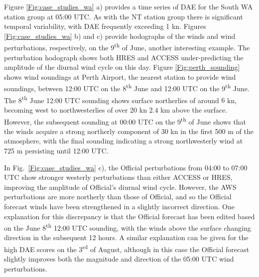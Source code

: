 \documentclass[twocol]{ametsoc}
\begin{document}
Figure \ref{Fig:case_studies_wa} a) provides a time series of DAE for the South WA station group at 05:00 UTC. As with the NT station group there is significant temporal variability, with DAE frequently exceeding 1 kn. Figures \ref{Fig:case_studies_wa} b) and c) provide hodographs of the winds and wind perturbations, respectively, on the 9\textsuperscript{th} of June, another interesting example. The perturbation hodograph shows both HRES and ACCESS under-predicting the amplitude of the diurnal wind cycle on this day. Figure \ref{Fig:perth_sounding} shows wind soundings at Perth Airport, the nearest station to provide wind soundings, between 12:00 UTC on the 8\textsuperscript{th} June and 12:00 UTC on the 9\textsuperscript{th} June. The 8\textsuperscript{th} June 12:00 UTC sounding shows surface northerlies of around $6$ kn, becoming west to northwesterlies of over 20 kn $2.4$ km above the surface. However, the subsequent sounding at 00:00 UTC on the 9\textsuperscript{th} of June shows that the winds acquire a strong northerly component of 30 kn in the first 500 m of the atmosphere, with the final sounding indicating a strong northwesterly wind at 725 m persisting until 12:00 UTC. 

In Fig.~\ref{Fig:case_studies_wa} c), the Official perturbations from 04:00 to 07:00 UTC show stronger westerly perturbations than either ACCESS or HRES, improving the amplitude of Official's diurnal wind cycle. However, the AWS perturbations are more northerly than those of Official, and so the Official forecast winds have been strengthened in a slightly incorrect direction. One explanation for this discrepancy is that the Official forecast has been edited based on the June 8\textsuperscript{th} 12:00 UTC sounding, with the winds above the surface changing direction in the subsequent 12 hours. A similar explanation can be given for the high DAE scores on the  3\textsuperscript{rd} of August, although in this case the Official forecast slightly improves both the magnitude and direction of the 05:00 UTC wind perturbations.
\end{document}
